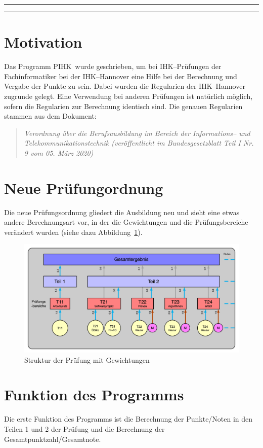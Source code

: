 \documentclass[a4paper,notitlepage,parskip=half]{scrartcl}
\newcommand{\pihk}{PIHK\ }
\begin{document}
\newpage
\rule{\linewidth}{1pt}
\tableofcontents
\rule{\linewidth}{1pt}

\newpage

\section{Motivation}
Das Programm \pihk wurde geschrieben, um bei IHK--Prüfungen der Fachinformatiker
bei der IHK--Hannover eine Hilfe bei der Berechnung und Vergabe der Punkte zu sein. Dabei wurden die 
Regularien der IHK--Hannover zugrunde gelegt. Eine Verwendung bei anderen Prüfungen
ist natürlich möglich, sofern die Regularien zur Berechnung identisch sind.
Die genauen Regularien stammen aus dem Dokument:

\begin{quote}
\emph{Verordnung über die Berufsausbildung im Bereich der Informations-- und Telekommunikationstechnik  (veröffentlicht im Bundesgesetzblatt Teil I Nr. 9 vom 05. März 2020)}
\end{quote}

\section{Neue Prüfungordnung}
Die neue Prüfungsordnung gliedert die Ausbildung neu und sieht eine etwas andere Berechnungsart vor, in der die Gewichtungen 
und die Prüfungsbereiche verändert wurden  (siehe dazu Abbildung~\ref{fig:berechnung}).

\begin{figure}[ht]
    \centering
\includegraphics[width=15cm]{FIGrafik.png}
    \caption{Struktur der Prüfung mit Gewichtungen}
    \label{fig:berechnung}
\end{figure}

\section{Funktion des Programms}
Die erste Funktion des Programms ist die Berechnung der Punkte/Noten in den Teilen 1 und 2 der Prüfung und die Berechnung der Gesamtpunktzahl/Gesamtnote.
\end{document}
